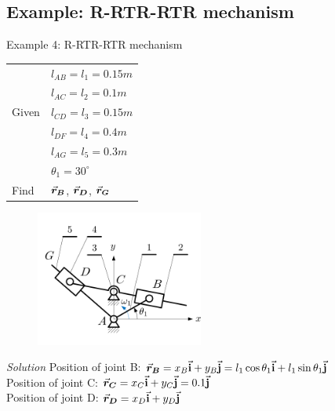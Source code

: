 \subsection{Example: R-RTR-RTR mechanism}

\begin{frame}
	\begin{block}{Example 4: R-RTR-RTR mechanism}
		\begin{table}
			\begin{minipage}{0.5\linewidth}
				\begin{tabular}{l|l}
					& $l_{AB}=l_1=0.15m$\\
					& $l_{AC}=l_2=0.1m$\\
					Given & $l_{CD}=l_3=0.15m$\\
					& $l_{DF}=l_4=0.4m$\\
					& $l_{AG}=l_5=0.3m$\\
					& $\theta_1=30^{\circ}$\\ \hline
					Find & $\vec{\bm{r}}_{\bm{B}}$, $\vec{\bm{r}}_{\bm{D}}$, $\vec{\bm{r}}_{\bm{G}}$
				\end{tabular}
			\end{minipage}\hfill
			\begin{minipage}{0.5\linewidth}
				\begin{figure}
					\includegraphics[width=55mm]{images/R-RTR-RTR.png}
				\end{figure}
			\end{minipage}
		\end{table}	
	\end{block}
\emph{Solution}\vskip2.5mm
Position of joint B:  $\displaystyle \vec{\bm{r}}_{\bm{B}} = x_B\vec{\mathbf{i}} + y_B\vec{\mathbf{j}} = l_1\cos{\theta_1}\vec{\mathbf{i}} + l_1\sin{\theta_1}\vec{\mathbf{j}}$\\
Position of joint C:  $\displaystyle \vec{\bm{r}}_{\bm{C}} = x_C\vec{\mathbf{i}} + y_C\vec{\mathbf{j}} = 0.1\vec{\mathbf{j}}$\\
Position of joint D: $\displaystyle \vec{\bm{r}}_{\bm{D}} = x_D\vec{\mathbf{i}} + y_D\vec{\mathbf{j}}$\\
\end{frame}

